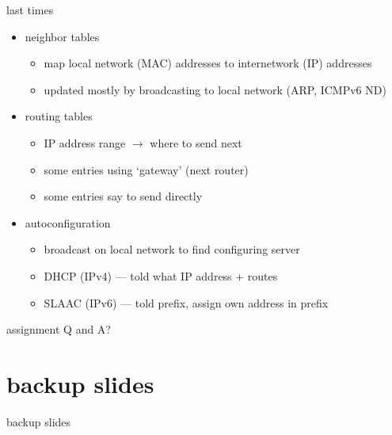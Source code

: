 \date{}
\title{}
\date{}
\usepackage{pgfplots}
\pgfplotsset{compat=1.16}

\begin{frame}
    \titlepage
\end{frame}

\begin{frame}{last times}
    \begin{itemize}
    \item neighbor tables
        \begin{itemize}
        \item map local network (MAC) addresses to internetwork (IP) addresses
        \item updated mostly by broadcasting to local network (ARP, ICMPv6 ND)
        \end{itemize}
    \item routing tables
        \begin{itemize}
        \item IP address range $\rightarrow$ where to send next
        \item some entries using `gateway' (next router)
        \item some entries say to send directly
        \end{itemize}
    \item autoconfiguration
        \begin{itemize}
        \item broadcast on local network to find configuring server
        \item DHCP (IPv4) --- told what IP address + routes
        \item SLAAC (IPv6) --- told prefix, assign own address in prefix
        \end{itemize}
    \end{itemize}
\end{frame}

\begin{frame}{assignment Q and A?}
\end{frame}



\section{backup slides}
\begin{frame}{backup slides}
\end{frame}

%


